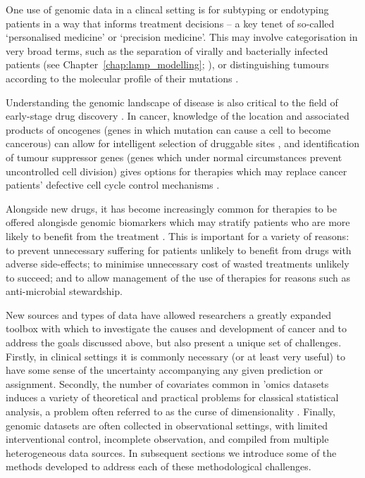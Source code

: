 \documentclass[thesis.tex]{subfiles}
\begin{document}
One use of genomic data in a clincal setting is for subtyping or endotyping patients in a way that informs treatment decisions -- a key tenet of so-called `personalised medicine' or `precision medicine'. This may involve categorisation in very broad terms, such as the separation of virally and bacterially infected patients (see Chapter~\ref{chap:lamp_modelling}; \citealp{remmel_diagnostic_2022}), or distinguishing tumours according to the molecular profile of their mutations \citep{zhao_molecular_2019}.

Understanding the genomic landscape of disease is also critical to the field of early-stage drug discovery \citep{nelson_support_2015, raja_integrating_2017, king_are_2019}. In cancer, knowledge of the location and associated products of oncogenes (genes in which mutation can cause a cell to become cancerous) can allow for intelligent selection of druggable sites \citep{weinstein_cancer_2002, bedard_small_2020}, and identification of tumour suppressor genes (genes which under normal circumstances prevent uncontrolled cell division) gives options for therapies which may replace cancer patients' defective cell cycle control mechanisms \citep{fang_tumor-suppressing_2003, morris_therapeutic_2015}. 

Alongside new drugs, it has become increasingly common for therapies to be offered alongisde genomic biomarkers which may stratify patients who are more likely to benefit from the treatment \citep{weber_egfr_2014, awad_precision_2019, zhu_association_2019, safarika_29-mrna_2021}. This is important for a variety of reasons: to prevent unnecessary suffering for patients unlikely to benefit from drugs with adverse side-effects; to minimise unnecessary cost of wasted treatments unlikely to succeed; and to allow management of the use of therapies for reasons such as anti-microbial stewardship.

New sources and types of data have allowed researchers a greatly expanded
toolbox with which to investigate the causes and development of cancer and to address the goals discussed above, but
also present a unique set of challenges. Firstly, in clinical settings it is commonly necessary (or at least very useful) to have some sense of the uncertainty accompanying any given prediction or assignment. Secondly, the number of covariates common in ’omics datasets induces a variety of theoretical and practical problems for classical statistical analysis, a problem often referred to as the curse of dimensionality \citep{barbour_precision_2019, buhlmann_high-dimensional_2014}. Finally, genomic datasets are often collected in observational settings, with limited interventional control, incomplete observation, and compiled from multiple heterogeneous data sources. In subsequent sections we introduce some of the methods developed to address each of these methodological challenges.
\end{document}
